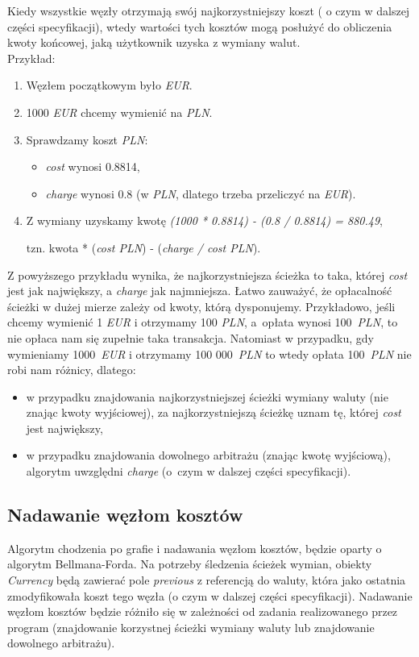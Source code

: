 \documentclass[a4paper,11pt]{article}
\begin{document}
Kiedy wszystkie węzły otrzymają swój najkorzystniejszy koszt ( o czym w dalszej części specyfikacji), wtedy wartości tych kosztów mogą posłużyć do obliczenia kwoty końcowej, jaką użytkownik uzyska z wymiany walut.
\\Przykład:
\begin{enumerate}
\item Węzłem początkowym było \textit{EUR}.
\item 1000 \textit{EUR} chcemy wymienić na \textit{PLN}.
\item Sprawdzamy koszt \textit{PLN}:
\begin{itemize}
\item \textit{cost} wynosi 0.8814,
\item \textit{charge} wynosi 0.8 (w \textit{PLN}, dlatego trzeba przeliczyć na \textit{EUR}).
\end{itemize}
\item Z wymiany uzyskamy kwotę \textit{(1000 * 0.8814) - (0.8 / 0.8814) = 880.49},

		tzn. kwota * (\textit{cost PLN}) - (\textit{charge / cost PLN}).
\end{enumerate}

Z powyższego przykładu wynika, że najkorzystniejsza ścieżka to taka, której \textit{cost} jest jak największy, a \textit{charge} jak najmniejsza. Łatwo zauważyć, że opłacalność ścieżki w dużej mierze zależy od kwoty, którą dysponujemy. Przykładowo, jeśli chcemy wymienić 1 \textit{EUR} i otrzymamy 100 \textit{PLN}, a~opłata wynosi 100~\textit{PLN}, to nie opłaca nam się zupełnie taka transakcja. Natomiast w przypadku, gdy wymieniamy 1000~\textit{EUR} i otrzymamy 100 000~\textit{PLN} to wtedy opłata 100~\textit{PLN} nie robi nam różnicy, dlatego:
\begin{itemize}
\item w przypadku znajdowania najkorzystniejszej ścieżki wymiany waluty (nie znając kwoty wyjściowej), za najkorzystniejszą ścieżkę uznam tę, której \textit{cost} jest największy,
\item w przypadku znajdowania dowolnego arbitrażu (znając kwotę wyjściową), algorytm uwzględni \textit{charge} (o~czym w dalszej części specyfikacji).
\end{itemize}

\subsection{Nadawanie węzłom kosztów}
Algorytm chodzenia po grafie i nadawania węzłom kosztów, będzie oparty o algorytm Bellmana-Forda. Na potrzeby śledzenia ścieżek wymian, obiekty \textit{Currency} będą zawierać pole \textit{previous} z referencją do waluty, która jako ostatnia zmodyfikowała koszt tego węzła (o czym w dalszej części specyfikacji). Nadawanie węzłom kosztów będzie różniło się w zależności od zadania realizowanego przez program (znajdowanie korzystnej ścieżki wymiany waluty lub znajdowanie dowolnego arbitrażu).
\end{document}
